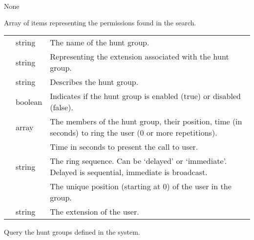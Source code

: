 \documentclass[letterpaper,10pt,english]{sphinxmanual}
\begin{document}
 None

 Array of items representing the permissions found in the search.


\begin{savenotes}\sphinxattablestart
\centering
\begin{tabulary}{\linewidth}[t]{|T|T|T|}
\hline

&
&
\\
\hline
{}
&
string
&
The name of the hunt group.
\\
\hline
{}
&
string
&
Representing the extension associated with the hunt group.
\\
\hline
{}
&
string
&
Describes the hunt group.
\\
\hline
{}
&
boolean
&
Indicates if the hunt group is enabled (true) or disabled (false).
\\
\hline
{}
&
array
&
The members of the hunt group, their position, time (in seconds) to ring the user (0 or more repetitions).
\\
\hline
{}
&&
Time in seconds to present the call to user.
\\
\hline
{}
&
string
&
The ring sequence. Can be ‘delayed’ or ‘immediate’. Delayed is sequential, immediate is broadcast.
\\
\hline
{}
&&
The unique position (starting at 0) of the user in the group.
\\
\hline
{}
&
string
&
The extension of the user.
\\
\hline
\end{tabulary}
\par
\sphinxattableend\end{savenotes}

 Query the hunt groups defined in the system.

\begin{sphinxVerbatim}[commandchars=\\\{\}]
 
\end{sphinxVerbatim}
\end{document}
